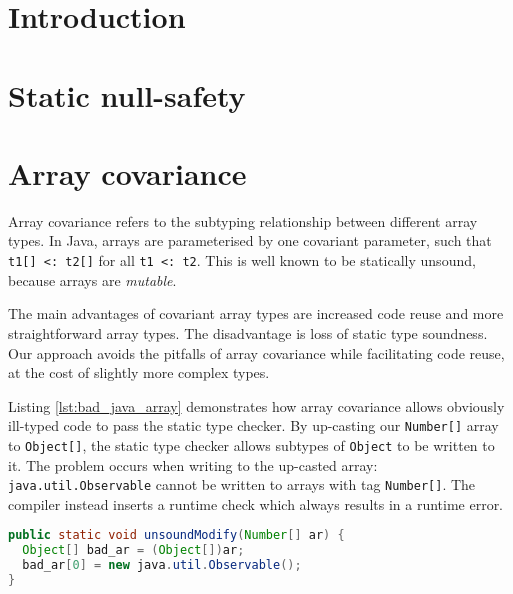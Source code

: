\documentclass[preprint]{sigplanconf}
\begin{document}


\terms

\keywords

\section{Introduction}

\section{Static null-safety}

\section{Array covariance}

Array covariance refers to the subtyping relationship between different array types.
In Java, arrays are parameterised by one covariant parameter, such that
\lstinline|t1[] <: t2[]| for all \lstinline|t1 <: t2|. This is well known to be statically unsound,
because arrays are \emph{mutable}. 

The main advantages of covariant array types are increased code reuse
and more straightforward array types.
The disadvantage is loss of static type soundness.
Our approach avoids the pitfalls of array covariance
while facilitating code reuse, at the cost of slightly more complex types.

Listing \ref{lst:bad_java_array} demonstrates how array covariance allows
obviously ill-typed code to pass the static type checker.
By up-casting our \lstinline|Number[]| array to \lstinline|Object[]|,
the static type checker allows subtypes of \lstinline|Object|
to be written to it.
The problem occurs when writing to the up-casted array:
\lstinline|java.util.Observable| cannot be written to arrays with tag \lstinline|Number[]|.
The compiler instead inserts a runtime check which always results in a runtime error.

\begin{lstlisting}[language=java, label=lst:bad_java_array, caption=Statically unsound Java array manipulation]
public static void unsoundModify(Number[] ar) {
  Object[] bad_ar = (Object[])ar;
  bad_ar[0] = new java.util.Observable();
}
\end{lstlisting}
\end{document}
